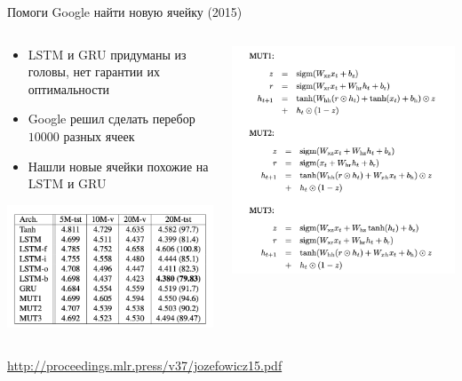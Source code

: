 \documentclass[notes,12pt, aspectratio=169]{beamer}
\begin{document}
\begin{frame}{Помоги Google найти новую ячейку (2015)}
\begin{columns}
	\begin{column}{.55\linewidth}
		\begin{itemize} 
			\item  LSTM и GRU придуманы из головы, нет гарантии их оптимальности
			\item  Google решил сделать перебор $10000$ разных ячеек
			\item  Нашли новые ячейки похожие на LSTM и GRU
		\end{itemize}
	\begin{center}
		\includegraphics[width=.65\linewidth]{google-cell2.png}
	\end{center}
	\end{column}	
	\begin{column}{.45\linewidth}			
		\begin{center}
			\includegraphics[width=.99\linewidth]{google_cell.png}
		\end{center}
	\end{column}	
\end{columns}
\vfill 
\footnotesize 
\color{blue} \url{http://proceedings.mlr.press/v37/jozefowicz15.pdf} 
\end{frame}
\end{document}
